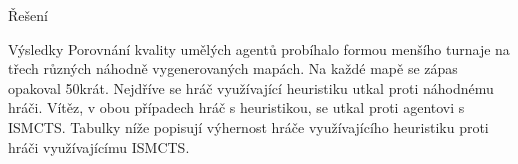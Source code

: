 \documentclass[portrait,a0paper,fontscale=0.25]{baposter}
\begin{document}
\begin{poster}
\begin{posterbox}[column=0, name=something1, below=goals]{Řešení}



\end{posterbox}


%
%


%
%
%

\begin{posterbox}[column=1, name=result1]{Výsledky}
Porovnání kvality umělých agentů probíhalo formou menšího turnaje na třech různých náhodně vygenerovaných mapách. Na každé mapě se zápas opakoval 50krát. Nejdříve se hráč využívající heuristiku utkal proti náhodnému hráči. Vítěz, v obou případech hráč s heuristikou, se utkal proti agentovi s ISMCTS. Tabulky níže popisují výhernost hráče využívajícího heuristiku proti hráči využívajícímu ISMCTS.  


\end{posterbox}
\end{poster}
\end{document}
